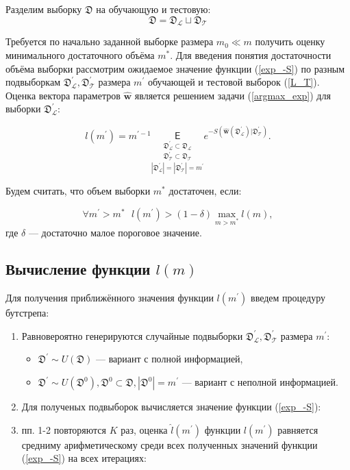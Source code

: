 \documentclass[12pt, a4paper]{scrartcl}
\theoremstyle{plain}
\theoremstyle{definition}
\begin{document}
Разделим выборку $\mathfrak{D}$ на обучающую и тестовую:
\begin{equation}\label{L_T}
\mathfrak{D} = \mathfrak{D}_{\mathcal{L}} \sqcup \mathfrak{D}_{\mathcal{T}}
\end{equation}

Требуется по начально заданной выборке размера $m_0 \ll m$ получить оценку минимального достаточного объёма $m^{*}$. Для введения понятия достаточности объёма  выборки рассмотрим ожидаемое значение функции (\ref{exp_-S}) по разным подвыборкам $\mathfrak D^{\prime}_{\mathcal{L}}, \mathfrak D^{\prime}_{\mathcal{T}}$ размера $m^{\prime}$ обучающей и тестовой выборок (\ref{L_T}). Оценка вектора параметров $\hat{\mathbf{w}}$ является решением задачи (\ref{argmax_exp}) для выборки $\mathfrak D^{\prime}_{\mathcal{L}}$:

\begin{equation}\label{l}
l(m^{\prime}) = m^{\prime-1}\underset{|\mathfrak D^{\prime}_{\mathcal{L}}| = |\mathfrak D^{\prime}_{\mathcal{T}}| = m^{\prime}}{\underset{\mathfrak D^{\prime}_{\mathcal{T}} \subset \mathfrak D_{\mathcal{T}}}{\underset{\mathfrak D^{\prime}_{\mathcal{L}} \subset \mathfrak D_{\mathcal{L}}}{\mathsf E}}} e^{-S(\hat{\mathbf{w}}(\mathfrak{D}^{\prime}_{\mathcal{L}}) | \mathfrak{D}^{\prime}_{\mathcal{T}})}.
\end{equation}

Будем считать, что объем выборки $m^*$ достаточен, если:

$$
\forall m^{\prime} > m^* ~~~ l(m^{\prime}) > (1 - \delta)\max\limits_{m > m^*}l(m),
$$
где $\delta$ --- достаточно малое пороговое значение.

\subsection{Вычисление функции $l(m)$}

Для получения приближённого значения функции $l(m^{\prime})$ введем процедуру бутстрепа:

\begin{enumerate}
	\item Равновероятно генерируются случайные подвыборки $\mathfrak D^{\prime}_{\mathcal{L}}, \mathfrak D^{\prime}_{\mathcal{T}}$ размера $m^{\prime}$:

	\begin{itemize}
		\item $\mathfrak D^{\prime} \sim U(\mathfrak{D})$ --- вариант с полной информацией,
		\item $\mathfrak D^{\prime} \sim U(\mathfrak{D}^0), \mathfrak{D}^0 \subset \mathfrak{D}, |\mathfrak{D}^0| = m^{\prime}$ --- вариант с неполной информацией.
	\end{itemize}
	\item Для полученых подвыборок вычисляется значение функции (\ref{exp_-S}):
	\item пп. 1-2 повторяются $K$ раз, оценка $\hat{l}(m^{\prime})$ функции $l(m^{\prime})$ равняется средниму арифметическому среди всех полученных значений функции (\ref{exp_-S}) на всех итерациях:
\end{enumerate}
\end{document}

